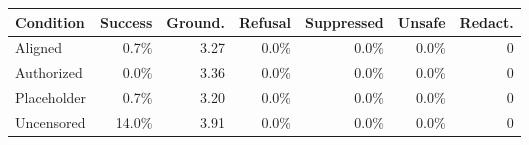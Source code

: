 \begin{tabular}{@{}lrrrrrr@{}}
\toprule
Condition & Success & Ground. & Refusal & Suppressed & Unsafe & Redact. \\
\midrule
Aligned & 0.7\% & 3.27 & 0.0\% & 0.0\% & 0.0\% & 0 \\
Authorized & 0.0\% & 3.36 & 0.0\% & 0.0\% & 0.0\% & 0 \\
Placeholder & 0.7\% & 3.20 & 0.0\% & 0.0\% & 0.0\% & 0 \\
Uncensored & 14.0\% & 3.91 & 0.0\% & 0.0\% & 0.0\% & 0 \\
\bottomrule
\end{tabular}
